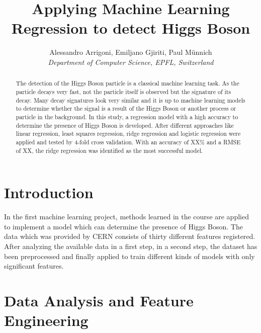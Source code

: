 \documentclass[10pt,conference,compsocconf]{IEEEtran}
\begin{document}
\title{Applying Machine Learning Regression to detect Higgs Boson}

\author{
  Alessandro Arrigoni, Emiljano Gjiriti, Paul M\"unnich\\
  \textit{Department of Computer Science, EPFL, Switzerland}
}

\maketitle

\begin{abstract}
The detection of the Higgs Boson particle is a classical machine learning task. As the particle decays very fast, not the particle itself is observed but the signature of its decay. Many decay signatures look very similar and it is up to machine learning models to determine whether the signal is a result of the Higgs Boson or another process or particle in the background. In this study, a regression model with a high accuracy to determine the presence of Higgs Boson is developed. After different approaches like linear regression, least squares regression, ridge regression and logistic regression were applied and tested by 4-fold cross validation. With an accuracy of XX\% and a RMSE of XX, the ridge regression was identified as the most successful model.

\end{abstract}

\section{Introduction}

In the first machine learning project, methods learned in the course are applied to implement a model which can determine the presence of Higgs Boson.
The data which was provided by CERN consists of thirty different features registered. After analyzing the available data in a first step, in a second step, the dataset has been preprocessed and finally applied to train different kinds of models with only significant features. 

\section{Data Analysis and Feature Engineering}
\label{sec:Data Analysis}
\end{document}
